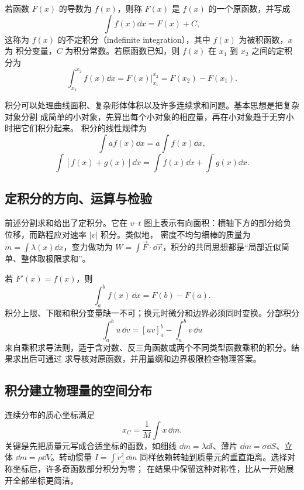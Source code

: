 {若函数 $F(x)$ 的导数为 $f(x)$，则称 $F(x)$ 是 $f(x)$ 的一个原函数，并写成
\begin{equation}
 \int f(x)\dd x=F(x)+C,
\end{equation}
这称为 $f(x)$ 的不定积分（indefinite integration），其中 $f(x)$ 为被积函数，$x$ 为
积分变量，$C$ 为积分常数。若原函数已知，则 $f(x)$ 在 $x_1$ 到 $x_2$ 之间的定积分为
\begin{equation}
 \int_{x_1}^{x_2}f(x)\dd x
 =\left.F(x)\right|_{x_1}^{x_2}=F(x_2)-F(x_1).
\end{equation}

\integralDiagram

积分可以处理曲线面积、复杂形体体积以及许多连续求和问题。基本思想是把复杂对象分割
成简单的小对象，先算出每个小对象的相应量，再在小对象趋于无穷小时把它们积分起来。
积分的线性规律为
\begin{equation}
 \int af(x)\dd x=a\int f(x)\dd x,
\end{equation}
\begin{equation}
 \int[f(x)+g(x)]\dd x
 =\int f(x)\dd x+\int g(x)\dd x.
\end{equation}

\subsection{定积分的方向、运算与检验}

前述分割求和给出了定积分。它在 $v$--$t$ 图上表示有向面积：横轴下方的部分给负位移，而路程应对速率 $|v|$ 积分。类似地，
密度不均匀细棒的质量为 $m=\int\lambda(x)\dd x$，变力做功为
$W=\int\vec F\cdot\dd\vec r$，积分的共同思想都是“局部近似简单、整体取极限求和”。

若 $F'(x)=f(x)$，则
\[
 \int_a^b f(x)\,\dd x=F(b)-F(a).
\]
积分上限、下限和积分变量缺一不可；换元时微分和边界必须同时变换。分部积分
\[
 \int_a^b u\,\dd v=[uv]_a^b-\int_a^b v\,\dd u
\]
来自乘积求导法则，适于含对数、反三角函数或两个不同类型函数乘积的积分。结果求出后可通过
求导核对原函数，并用量纲和边界极限检查物理答案。

\subsection{积分建立物理量的空间分布}

连续分布的质心坐标满足
\[
 x_C=\frac1M\int x\,\dd m.
\]
关键是先把质量元写成合适坐标的函数，如细线 $\dd m=\lambda\dd l$、薄片
$\dd m=\sigma\dd S$、立体 $\dd m=\rho\dd V$。转动惯量
$I=\int r_\perp^2\dd m$ 同样依赖转轴到质量元的垂直距离。选择对称坐标后，许多奇函数部分积分为零；
在结果中保留这种对称性，比从一开始展开全部坐标更简洁。

}
